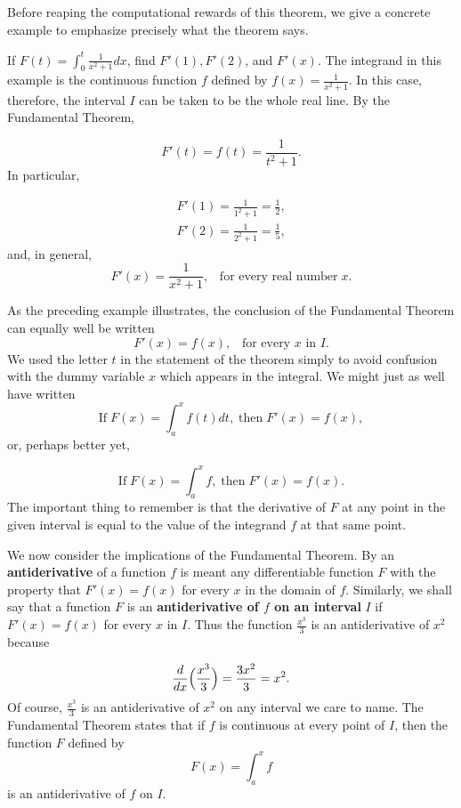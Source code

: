 Before reaping the computational rewards of this theorem, we give a concrete example to emphasize precisely what the theorem says.

\begin{example} 
If $F(t) = \int_{0}^{t} \frac{1}{x^2 + 1}dx$, find $F'(1), F'(2)$, and $F'(x)$.  The
integrand in this example is the continuous function $f$ defined by $f (x) = \frac{1}{x^2 + 1} $. In this case, therefore, the interval $I$ can be taken to be the whole real line. By the Fundamental Theorem,

$$
F'(t) = f(t) = \frac{1}{t^2 + 1}.
$$
\noindent In particular, 

\begin{eqnarray*}
F'(1) = \frac{1}{1^2 + 1} = \frac{1}{ 2},\\
F'(2) = \frac{1}{2^2 + 1} = \frac{1}{5}, 
\end{eqnarray*}
\noindent and, in general,
$$
F'(x) = \frac{1}{x^2 + 1}, \;\;\; \mbox{for every real number}\; x.
$$
\end{example}
\medskip

As the preceding example illustrates, the conclusion of the Fundamental Theorem can equally well be written
$$
F' (x) = f(x), \;\;\; \mbox{for every $x$ in $I$}.
$$
\noindent We used the letter $t$ in the statement of the theorem simply to avoid confusion with the dummy variable $x$ which appears in the integral. We might just as well have written
$$
\mbox{If}\; F(x) = \int_{a}^{x} f(t) dt, \;\mbox{then}\; F'(x) = f(x), 
$$
\noindent or, perhaps better yet,

$$
\mbox{If}\; F(x) = \int_{a}^{x} f, \;\mbox{then}\; F'(x) = f(x).
$$
\noindent The important thing to remember is that the derivative of $F$ at any point in the given interval is equal to the value of the integrand $f$ at that same point.

We now consider the implications of the Fundamental Theorem. By an \textbf{antiderivative} of a function $f$ is meant any differentiable function $F$ with the property that $F'(x) = f(x)$ for every $x$ in the domain of $f$. Similarly, we shall say that a function $F$ is an \textbf{antiderivative of $f$ on an interval} $I$ if $F' (x) = f(x)$ for every $x$ in $I$. Thus the function $\frac{x^3}{3}$ is an antiderivative  of $x^2$ because

$$
\frac{d}{dx} \Bigl( \frac{x^3}{3} \Bigr) = \frac{3x^2}{3} = x^2.
$$
\noindent Of course, $\frac{x^3}{3}$ is an antiderivative of $x^2$ on any interval we care to name. The Fundamental Theorem states that if $f$ is continuous at every point of $I$, then the function $F$ defined by
$$
F(x) = \int_{a}^{x} f
$$
\noindent is an antiderivative of $f$ on $I$.

